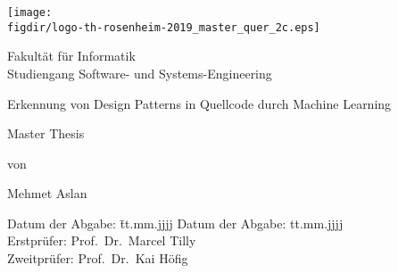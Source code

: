 \begin{titlepage}

\sffamily

\raggedleft

\vspace*{-2cm}

\texttt{[image: \\figdir/logo-th-rosenheim-2019\_master\_quer\_2c.eps]}

\vfill

\centering
\LARGE
Fakultät für Informatik  \vspace{0.5cm}\\
\Large
Studiengang Software- und Systems-Engineering

\vspace{2cm}

\LARGE

Erkennung von Design Patterns in Quellcode durch Machine Learning

\vspace{2cm}

\Large
Master Thesis

\vspace{1.5cm}


\Large
von

\vspace{0.5cm}


\LARGE
Mehmet Aslan \vspace{1cm}

\vspace{1cm}

\flushleft
 \Large
\vspace*{\fill}

\begin{tabbing}
Datum der Abgabe: \= tt.mm.jjjj \kill
Datum der Abgabe: \> tt.mm.jjjj \\
Erstprüfer: \> Prof.\ Dr.\ Marcel Tilly\\
Zweitprüfer: \> Prof.\ Dr.\ Kai Höfig
\end{tabbing}

\end{titlepage}

\cleardoubleemptypage

